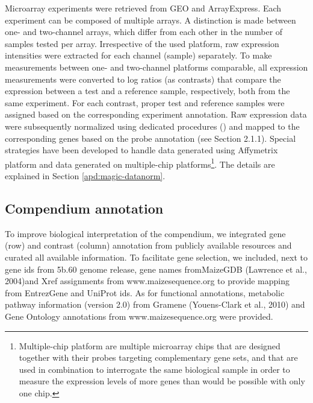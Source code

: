Microarray experiments were retrieved from GEO and ArrayExpress. Each 
experiment can be composed of multiple arrays. 
A distinction is made between one- and two-channel arrays, which differ from 
each other in the number of samples tested per array. 
Irrespective of the used platform, raw expression intensities were extracted 
for each channel (sample) separately. 
To make measurements between one- and two-channel platforms comparable, all
expression measurements were converted to log ratios (as contrasts) that
compare the expression between a test and a reference sample, respectively, 
both from the same experiment. 
For each contrast, proper test and reference samples were assigned based on the 
corresponding experiment annotation. 
Raw expression data were subsequently normalized using dedicated procedures 
(\cite{Engelen2011}) and mapped to the corresponding genes based on the probe 
annotation (see Section 2.1.1). 
Special strategies have been developed to handle data generated using 
Affymetrix platform and data generated on multiple-chip 
platforms\footnote{Multiple-chip platform are multiple microarray chips that 
are designed together with their probes targeting complementary gene sets, and 
that are used in combination to interrogate the same biological sample in order 
to measure the expression levels of more genes than would be possible with 
only one chip.}. 
The details are explained in Section \ref{apd:magic-datanorm}.


\subsection{Compendium annotation}

To improve biological interpretation of the compendium, we integrated
gene (row) and contrast (column) annotation from publicly available 
resources and curated all available information.
To facilitate gene selection, we included, next to gene ids from 5b.60
genome release, gene names fromMaizeGDB (Lawrence et al., 2004)and
Xref assignments from www.maizesequence.org to provide mapping from
EntrezGene and UniProt ids. As for functional annotations, metabolic
pathway information (version 2.0) from Gramene (Youens-Clark et al.,
2010) and Gene Ontology annotations from www.maizesequence.org
were provided.

